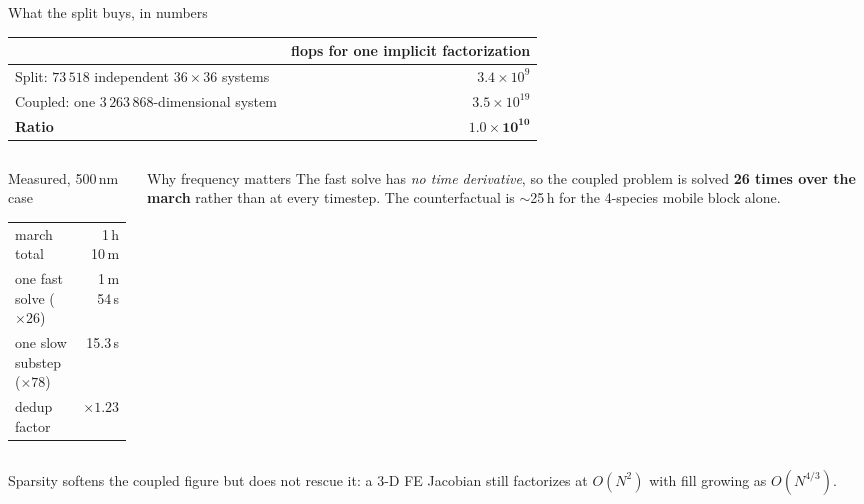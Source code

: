 \documentclass[aspectratio=169,10pt]{beamer}
\newcommand{\foot}[1]{\par\vspace{1ex}%
  \begingroup\footnotesize\raggedright #1\par\endgroup}
\begin{document}
\begin{frame}{What the split buys, in numbers}
\centering
\begin{tabular}{@{}lr@{}}
\toprule
 & flops for one implicit factorization \\
\midrule
Split: $73\,518$ independent $36\times36$ systems & $3.4\times10^{9}$ \\
Coupled: one $3\,263\,868$-dimensional system & $3.5\times10^{19}$ \\
\midrule
\textbf{Ratio} & $\bm{1.0\times10^{10}}$ \\
\bottomrule
\end{tabular}
\vspace{2ex}

\begin{columns}[T]
\begin{column}{0.47\textwidth}
\begin{block}{Measured, 500\,nm case}\small
\begin{tabular}{@{}lr@{}}
march total & 1\,h 10\,m \\
one fast solve ($\times26$) & 1\,m 54\,s \\
one slow substep ($\times78$) & 15.3\,s \\
dedup factor & $\times1.23$ \\
\end{tabular}
\end{block}
\end{column}
\begin{column}{0.47\textwidth}
\begin{block}{Why frequency matters}\small
The fast solve has \emph{no time derivative}, so the coupled problem is solved
\textbf{26 times over the march} rather than at every timestep. The
counterfactual is $\sim$25\,h for the 4-species mobile block alone.
\end{block}
\end{column}
\end{columns}
\foot{Sparsity softens the coupled figure but does not rescue it: a 3-D FE
Jacobian still factorizes at $O(N^2)$ with fill growing as $O(N^{4/3})$.}
\end{frame}
\end{document}
